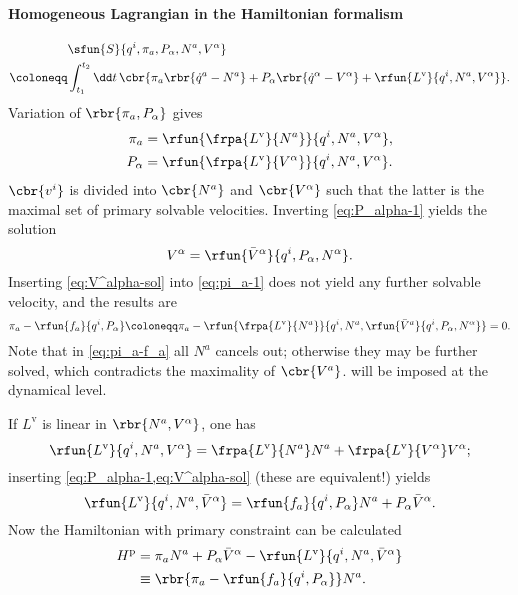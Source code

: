 \paragraph{Homogeneous Lagrangian in the Hamiltonian formalism}

\begin{align}
\phantom{}&\sfun{S}{q^i, \pi_a, P_\alpha, N^a, V^\alpha} \nonumber \\
\coloneqq& \int_{t_1}^{t_2} \dd t\,\cbr{ \pi_a \rbr{\dot q^a - N^a} + P_\alpha
\rbr{\dot q^\alpha - V^\alpha} + \rfun{L^\text{v}}{q^i, N^a, V^\alpha}}.
\end{align}
Variation of $\rbr{\pi_a, P_\alpha}$ gives
\begin{align}
\pi_a &= \rfun{\frpa{L^\text{v}}{N^a}}{q^i, N^a, V^\alpha},
\label{eq:pi_a-1}\\
P_\alpha &= \rfun{\frpa{L^\text{v}}{V^\alpha}}{q^i, N^a, V^\alpha}.
\label{eq:P_alpha-1}
\end{align}
$\cbr{v^i}$ is divided into $\cbr{N^a}$ and $\cbr{V^\alpha}$ such that the 
latter is the maximal set of primary solvable velocities. Inverting 
\cref{eq:P_alpha-1} yields the solution
\begin{equation}
V^\alpha = \rfun{\bar V^\alpha}{q^i, P_\alpha, N^\alpha}.
\label{eq:V^alpha-sol}
\end{equation}
Inserting \cref{eq:V^alpha-sol} into \cref{eq:pi_a-1} does not yield any 
further solvable velocity, and the results are
\begin{equation}
\pi_a - \rfun{f_a}{q^i, P_\alpha} \coloneqq \pi_a - 
\rfun{\frpa{L^\text{v}}{N^a}}{q^i, N^a,
\rfun{\bar V^a}{q^i, P_\alpha, N^\alpha}} = 0.
\label{eq:pi_a-f_a}
\end{equation}
Note that in \cref{eq:pi_a-f_a} all $N^a$ cancels out; otherwise they may be 
further solved, which contradicts the maximality of $\cbr{V^a}$. 
 will be imposed at the dynamical level.

If $L^\text{v}$ is linear in $\rbr{N^a, V^\alpha}$, one has
\begin{equation}
\rfun{L^\text{v}}{q^i, N^a, V^\alpha} = \frpa{L^\text{v}}{N^a}N^a + 
\frpa{L^\text{v}}{V^\alpha}V^\alpha;
\end{equation}
inserting \cref{eq:P_alpha-1,eq:V^alpha-sol} (these are equivalent!) yields
\begin{equation}
\rfun{L^\text{v}}{q^i, N^a, \bar V^\alpha} = \rfun{f_a}{q^i, P_\alpha} N^a + 
P_\alpha \bar V^\alpha.
\label{eq:L^v-bar-V}
\end{equation}
Now the Hamiltonian with primary constraint can be calculated
\begin{align}
H^\text{p} &= \pi_a N^a + P_\alpha \bar V^\alpha - 
\rfun{L^\text{v}}{q^i, N^a, \bar V^\alpha} \nonumber \\
&\equiv \rbr{\pi_a - \rfun{f_a}{q^i, P_\alpha}}N^a.
\end{align}



\cite{Border_2000}

